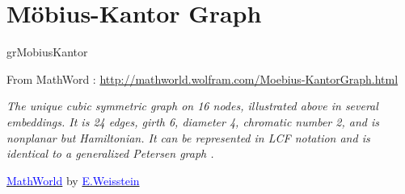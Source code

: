 \newpage\section{Möbius-Kantor Graph}\label{moebius}
\begin{NewMacroBox}{grMobiusKantor}{}

\medskip
From MathWord : \url{http://mathworld.wolfram.com/Moebius-KantorGraph.html} 

\emph{The unique cubic symmetric graph on 16 nodes, illustrated above in several embeddings. It is 24 edges, girth 6, diameter 4, chromatic number 2, and is nonplanar but Hamiltonian. It can be represented in LCF notation  and is identical to a generalized Petersen graph .
} 

\href{http://mathworld.wolfram.com/topics/GraphTheory.html}%
           {\textcolor{blue}{MathWorld}} by \href{http://en.wikipedia.org/wiki/Eric_W._Weisstein}%
           {\textcolor{blue}{E.Weisstein}}   
\end{NewMacroBox}




\subsection{}

\begin{center}
\begin{tkzexample}[vbox]
\end{tkzexample}
\end{center}
 
\vfill\newpage
\subsection{}
 
\begin{center}
\begin{tkzexample}[vbox]
\end{tkzexample} 
\end{center} 

